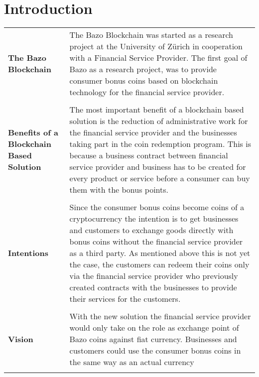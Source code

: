 \chapter{Introduction}
\thispagestyle{main} %

\begin{tabular}[t]{ p{3cm} p{12.5cm}}

\raggedright
\textbf{The Bazo Blockchain} & 
The Bazo Blockchain was started as a research project at the University of Zürich in cooperation with a Financial Service Provider. The first goal of Bazo as a research project, was to provide consumer bonus coins based on blockchain technology for the financial service provider. \\ \\

\raggedright
\textbf{Benefits of a Blockchain Based Solution} & 
The most important benefit of a blockchain based solution is the reduction of administrative work for the financial service provider and the businesses taking part in the coin redemption program. This is because a business contract between financial service provider and business has to be created for every product or service before a consumer can buy them with the bonus points.  \\ \\

\textbf{Intentions} &
Since the consumer bonus coins become coins of a cryptocurrency the intention is to get businesses and customers to exchange goods directly with bonus coins without the financial service provider as a third party. As mentioned above this is not yet the case, the customers can redeem their coins only via the financial service provider who previously created contracts with the businesses to provide their services for the customers. \\ \\

\textbf{Vision} & 
With the new solution the financial service provider would only take on the role as exchange point of Bazo coins against fiat currency. Businesses and customers could use the consumer bonus coins in the same way as an actual currency \\ \\


\end{tabular}
